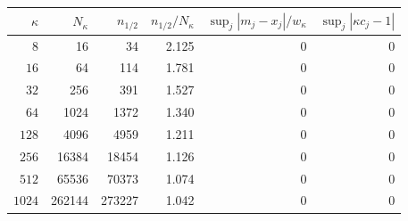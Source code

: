 \begin{tabular}{r rr rr r}
\toprule
$\kappa$ & $N_\kappa$ & $n_{1/2}$ & $n_{1/2}/N_\kappa$ & $\sup_j|m_j-x_j|/w_\kappa$ & $\sup_j|\kappa c_j-1|$ \\
\midrule
$8$ & 16 & 34 & 2.125 & 0 & 0 \\
$16$ & 64 & 114 & 1.781 & 0 & 0 \\
$32$ & 256 & 391 & 1.527 & 0 & 0 \\
$64$ & 1024 & 1372 & 1.340 & 0 & 0 \\
$128$ & 4096 & 4959 & 1.211 & 0 & 0 \\
$256$ & 16384 & 18454 & 1.126 & 0 & 0 \\
$512$ & 65536 & 70373 & 1.074 & 0 & 0 \\
$1024$ & 262144 & 273227 & 1.042 & 0 & 0 \\
\bottomrule
\end{tabular}
